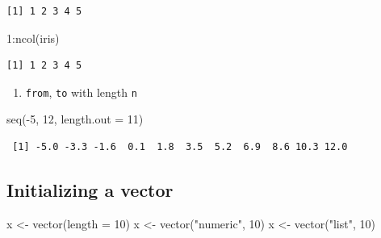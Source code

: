 \documentclass[
]{book}
\newenvironment{Shaded}{\begin{snugshade}}{\end{snugshade}}
\newcommand{\AttributeTok}[1]{\textcolor[rgb]{0.77,0.63,0.00}{#1}}
\newcommand{\DecValTok}[1]{\textcolor[rgb]{0.00,0.00,0.81}{#1}}
\newcommand{\FunctionTok}[1]{\textcolor[rgb]{0.00,0.00,0.00}{#1}}
\newcommand{\NormalTok}[1]{#1}
\newcommand{\OtherTok}[1]{\textcolor[rgb]{0.56,0.35,0.01}{#1}}
\newcommand{\SpecialCharTok}[1]{\textcolor[rgb]{0.00,0.00,0.00}{#1}}
\newcommand{\StringTok}[1]{\textcolor[rgb]{0.31,0.60,0.02}{#1}}
\providecommand{\tightlist}{%
  \setlength{\itemsep}{0pt}\setlength{\parskip}{0pt}}
\begin{document}
\begin{verbatim}
[1] 1 2 3 4 5
\end{verbatim}

\begin{Shaded}
\begin{Highlighting}[]
\DecValTok{1}\SpecialCharTok{:}\FunctionTok{ncol}\NormalTok{(iris)}
\end{Highlighting}
\end{Shaded}

\begin{verbatim}
[1] 1 2 3 4 5
\end{verbatim}

\begin{enumerate}
\def\labelenumi{\arabic{enumi}.}
\setcounter{enumi}{3}
\tightlist
\item
  \texttt{from}, \texttt{to} with length \texttt{n}
\end{enumerate}

\begin{Shaded}
\begin{Highlighting}[]
\FunctionTok{seq}\NormalTok{(}\SpecialCharTok{{-}}\DecValTok{5}\NormalTok{, }\DecValTok{12}\NormalTok{, }\AttributeTok{length.out =} \DecValTok{11}\NormalTok{)}
\end{Highlighting}
\end{Shaded}

\begin{verbatim}
 [1] -5.0 -3.3 -1.6  0.1  1.8  3.5  5.2  6.9  8.6 10.3 12.0
\end{verbatim}

\hypertarget{initializing-a-vector}{%
\subsection{Initializing a vector}\label{initializing-a-vector}}

\begin{Shaded}
\begin{Highlighting}[]
\NormalTok{x }\OtherTok{\textless{}{-}} \FunctionTok{vector}\NormalTok{(}\AttributeTok{length =} \DecValTok{10}\NormalTok{)}
\NormalTok{x }\OtherTok{\textless{}{-}} \FunctionTok{vector}\NormalTok{(}\StringTok{"numeric"}\NormalTok{, }\DecValTok{10}\NormalTok{)}
\NormalTok{x }\OtherTok{\textless{}{-}} \FunctionTok{vector}\NormalTok{(}\StringTok{"list"}\NormalTok{, }\DecValTok{10}\NormalTok{)}
\end{Highlighting}
\end{Shaded}
\end{document}

